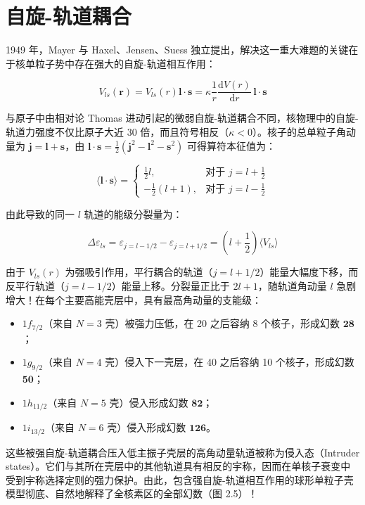 \section{自旋-轨道耦合\label{sec:=0081EA=0065CB-=008F68=009053=008026=005408}}

1949 年，Mayer \cite{Ma49} 与 Haxel、Jensen、Suess \cite{HJS49} 独立提出，解决这一重大难题的关键在于核单粒子势中存在强大的自旋-轨道相互作用：

\begin{equation}
V_{ls}(\boldsymbol{r})=V_{ls}(r)\boldsymbol{l}\cdot\boldsymbol{s}=\kappa\frac{1}{r}\frac{\mathrm{d}V(r)}{\mathrm{d}r}\,\boldsymbol{l}\cdot\boldsymbol{s}\label{eq:spin_orbit_potential}
\end{equation}

与原子中由相对论 Thomas 进动引起的微弱自旋-轨道耦合不同，核物理中的自旋-轨道力强度不仅比原子大近 30 倍，而且符号相反（$\kappa<0$）。核子的总单粒子角动量为
$\boldsymbol{j}=\boldsymbol{l}+\boldsymbol{s}$，由 $\boldsymbol{l}\cdot\boldsymbol{s}=\frac{1}{2}(\boldsymbol{j}^{2}-\boldsymbol{l}^{2}-\boldsymbol{s}^{2})$
可得算符本征值为：

\begin{equation}
\langle\boldsymbol{l}\cdot\boldsymbol{s}\rangle=\begin{cases}
\frac{1}{2}l, & \text{对于 }j=l+\frac{1}{2}\\
-\frac{1}{2}(l+1), & \text{对于 }j=l-\frac{1}{2}
\end{cases}\label{eq:ls_eigenvalues}
\end{equation}

由此导致的同一 $l$ 轨道的能级分裂量为：

\begin{equation}
\Delta\varepsilon_{ls}=\varepsilon_{j=l-1/2}-\varepsilon_{j=l+1/2}=\left(l+\frac{1}{2}\right)\langle V_{ls}\rangle\label{eq:ls_splitting}
\end{equation}

由于 $V_{ls}(r)$ 为强吸引作用，平行耦合的轨道（$j=l+1/2$）能量大幅度下移，而反平行轨道（$j=l-1/2$）能量上移。分裂量正比于
$2l+1$，随轨道角动量 $l$ 急剧增大！在每个主要高能壳层中，具有最高角动量的支能级：
\begin{itemize}
\item $1f_{7/2}$（来自 $N=3$ 壳）被强力压低，在 20 之后容纳 8 个核子，形成幻数 $\mathbf{28}$；
\item $1g_{9/2}$（来自 $N=4$ 壳）侵入下一壳层，在 40 之后容纳 10 个核子，形成幻数 $\mathbf{50}$；
\item $1h_{11/2}$（来自 $N=5$ 壳）侵入形成幻数 $\mathbf{82}$；
\item $1i_{13/2}$（来自 $N=6$ 壳）侵入形成幻数 $\mathbf{126}$。
\end{itemize}
这些被强自旋-轨道耦合压入低主振子壳层的高角动量轨道被称为侵入态（Intruder states）。它们与其所在壳层中的其他轨道具有相反的宇称，因而在单核子衰变中受到宇称选择定则的强力保护。由此，包含强自旋-轨道相互作用的球形单粒子壳模型彻底、自然地解释了全核素区的全部幻数（图
2.5）！

